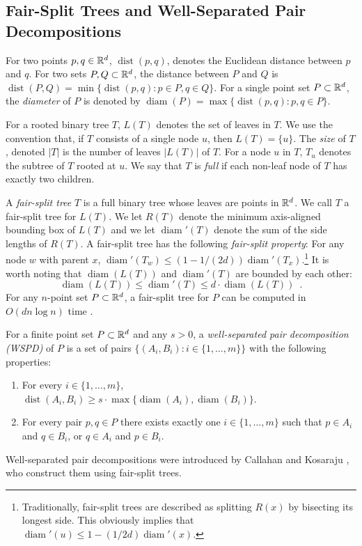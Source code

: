 \documentclass{patmorin}
\DeclareMathOperator{\diam}{diam}
\DeclareMathOperator{\dist}{dist}
\begin{document}
\subsection{Fair-Split Trees and Well-Separated Pair Decompositions}

For two points $p,q\in\mathbb{R}^d$, $\dist(p,q)$, denotes the Euclidean distance
between $p$ and $q$. For two sets $P,Q\subset\mathbb{R}^d$, the distance between
$P$ and $Q$ is $\dist(P,Q)=\min\{\dist(p,q):p\in P, q\in Q\}$.  For a
single point set $P\subset\mathbb{R}^d$, the \emph{diameter} of $P$ is denoted
by $\diam(P)=\max\{\dist(p,q):p,q\in P\}$.

For a rooted binary tree $T$, $L(T)$ denotes the set of leaves in
$T$. We use the convention that, if $T$ consists of a single node $u$,
then $L(T)=\{u\}$. The \emph{size} of $T$, denoted $|T|$ is the number of
leaves $|L(T)|$ of $T$. For a node $u$ in $T$, $T_u$ denotes the subtree
of $T$ rooted at $u$.  We say that $T$ is \emph{full} if each non-leaf
node of $T$ has exactly two children.

A \emph{fair-split tree} $T$ is a full binary tree whose
leaves are points in $\mathbb{R}^d$.  We call $T$ a fair-split tree for $L(T)$.
We let $R(T)$ denote the minimum
axis-aligned bounding box of $L(T)$ and we let $\diam'(T)$ denote the
sum of the side lengths of $R(T)$.  A fair-split tree has the following
\emph{fair-split property}: For any node $w$ with parent $x$, $\diam'(T_w)
\le (1-1/(2d))\diam'(T_x)$.\footnote{Traditionally, fair-split trees
are described as splitting $R(x)$ by bisecting its longest side.
This obviously implies that $\diam'(u)\le 1-(1/2d)\diam'(x)$.} It is worth
noting that $\diam(L(T))$ and $\diam'(T)$ are bounded by each other:
\[
	\diam(L(T)) \le \diam'(T) \le d\cdot\diam(L(T)) \enspace .
\]	
For any $n$-point set $P\subset\mathbb{R}^d$, a fair-split tree for $P$ can be
computed in $O(dn\log n)$ time \cite{callahan.kosaraju:decomposition}.

For a finite point set $P\subset\mathbb{R}^d$ and any $s>0$, a
\emph{well-separated pair decomposition (WSPD)} of $P$ is a set of pairs
$\{(A_i,B_i):i\in\{1,\ldots,m\}\}$ with the following properties:
\begin{enumerate}
  \item For every $i\in\{1,\ldots,m\}$, 
    $\dist(A_i,B_i)\ge s\cdot\max\{\diam(A_i),\diam(B_i)\}$.
  \item For every pair $p,q\in P$ there exists exactly one
    $i\in\{1,\ldots,m\}$ such that $p\in A_i$ and $q\in B_i$, or $q\in A_i$
    and $p\in B_i$.
\end{enumerate}
Well-separated pair decompositions were introduced by Callahan and
Kosaraju \cite{callahan.kosaraju:decomposition}, who construct them
using fair-split trees.
\end{document}
